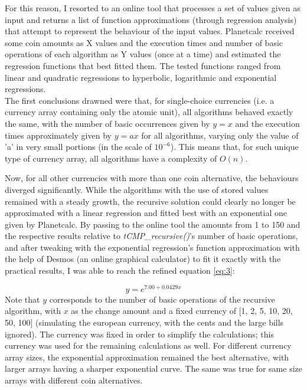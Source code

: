 \documentclass[shortpaper]{revdetua}
\begin{document}
For this reason, I resorted to an online tool that processes a set of values
given as input and returns a list of function approximations (through regression
analysis) that attempt to represent the behaviour of the input values.
Planetcalc \cite{planetcalc} received some coin amounts as X values and the
execution times and number of basic operations of each algorithm as Y values 
(once at a time) and estimated the regression functions that best fitted them.
The tested functions ranged from linear and quadratic regressions to hyperbolic,
logarithmic and exponential regressions. \\

The first conclusions drawned were that, for single-choice currencies (i.e. a 
currency array containing only the atomic unit), all algorithms behaved exactly
the same, with the number of basic occurrences given by $y=x$ and the execution
times approximately given by $y=ax$ for all algorithms, varying only the value
of 'a' in very small portions (in the scale of $10^{-6}$).
This means that, for such unique type of currency array, all algorithms have a 
complexity of $O(n)$.

Now, for all other currencies with more than one coin alternative, the 
behaviours diverged significantly.
While the algorithms with the use of stored values remained with a steady growth,
the recursive solution could clearly no longer be approximated with a linear 
regression and fitted best with an exponential one given by Planetcalc.
By passing to the online tool the amounts from 1 to 150 and the respective 
results relative to {\it tCMP\_recursive()\/}'s number of basic operations, and
after tweaking with the exponential regression's function approximation with 
the help of Desmos \cite{desmos} (an online graphical calculator) to fit it 
exactly with the practical results, I was able to reach the refined equation 
\ref{eq:3}:

{
\begin{equation} \label{eq:3}
    y = e^{7.00+0.0429x}
\end{equation}
}
Note that $y$ corresponds to the number of basic operations of the recursive 
algorithm, with $x$ as the change amount and a fixed currency of 
[1, 2, 5, 10, 20, 50, 100] (simulating the european currency, with the cents and 
the large bills ignored).
The currency was fixed in order to simplify the calculations; this currency was
used for the remaining calculations as well.
For different currency array sizes, the exponential approximation remained the 
best alternative, with larger arrays having a sharper exponential curve.
The same was true for same size arrays with different coin alternatives.
\end{document}
